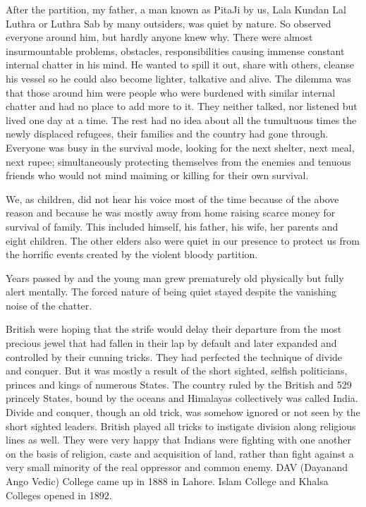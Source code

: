 After the partition, my father, a man known as PitaJi by us, Lala Kundan Lal Luthra or Luthra Sab by many outsiders, was quiet by nature. So observed everyone around him, but hardly anyone knew why. There were almost insurmountable problems, obstacles, responsibilities causing immense constant internal chatter in his mind. He wanted to spill it out, share with others, cleanse his vessel so he could also become lighter, talkative and alive. The dilemma was that those  around him were people who were burdened with similar internal chatter and had no place to add more to it. They neither talked, nor listened but lived one day at a time. The rest had no idea about all the tumultuous times the newly displaced refugees, their families and the country had gone through. Everyone was busy in the survival mode, looking for the next shelter, next meal, next rupee; simultaneously protecting themselves from the enemies and tenuous friends who would not mind maiming or killing for their own survival. 

We, as children, did not hear his voice most of the time because of the above reason and because he was mostly away from home raising scarce money for survival of family. This included himself, his father, his wife, her parents and eight children. The other elders also were quiet in our presence to protect us from the horrific events created by the violent bloody partition. 

Years passed by and the young man grew prematurely old physically but fully alert mentally. The forced nature of being quiet stayed despite the vanishing noise of the chatter. 

British were hoping that the strife would delay their departure from the most precious jewel that had fallen in their lap by default and later expanded and controlled by their cunning tricks. They had perfected the technique of divide and conquer. But it was mostly a result of the short sighted, selfish politicians, princes and kings of numerous States. The country ruled by the British and 529 princely States, bound by the oceans and Himalayas collectively was called India. Divide and conquer, though an old trick, was somehow ignored or not seen by the short sighted leaders. British played all tricks to instigate division along religious lines as well. They were very happy that Indians were fighting with one another on the basis of religion, caste and acquisition of land, rather than fight against a very small minority of the real oppressor and common enemy. DAV (Dayanand Ango Vedic) College came up in 1888 in Lahore. Islam College and Khalsa Colleges opened in 1892. 

